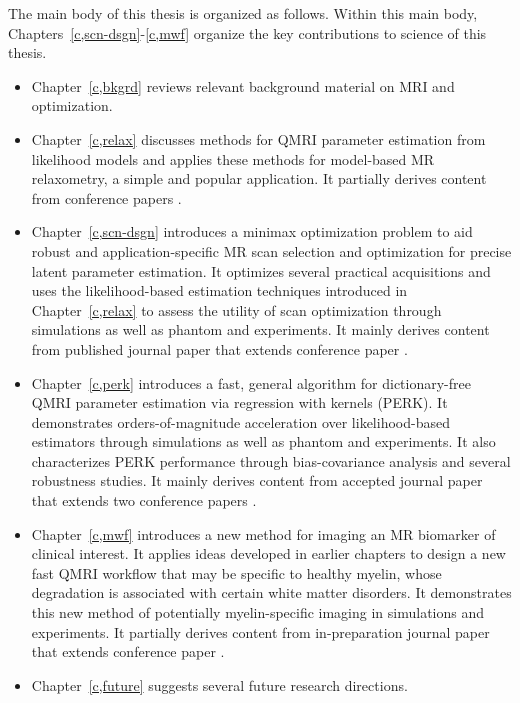 The main body of this thesis is organized as follows.
Within this main body,
Chapters~\ref{c,scn-dsgn}-\ref{c,mwf}
organize the key contributions to science
of this thesis.
\begin{itemize}
\setlength\itemsep{0.5em}
	\item{%
		Chapter~\ref{c,bkgrd} reviews 
		relevant background material
		on MRI and optimization.
	}%
	\item{%
		Chapter~\ref{c,relax} discusses methods 
		for QMRI parameter estimation 
		from likelihood models 
		and applies these methods 
		for model-based MR relaxometry,
		a simple and popular application.
		It partially derives content
		from conference papers 
		\cite{nataraj:14:rje,nataraj:14:mbe}.
	}%
	\item{%
		Chapter~\ref{c,scn-dsgn} introduces
		a minimax optimization problem
		to aid robust and application-specific 
		MR scan selection and optimization 
		for precise latent parameter estimation.
		It optimizes several practical acquisitions 
		and uses the likelihood-based estimation techniques 
		introduced in Chapter~\ref{c,relax}
		to assess the utility
		of scan optimization
		through simulations 
		as well as phantom and \invivo experiments.
		It mainly derives content
		from published journal paper
		\cite{nataraj:17:oms}
		that extends conference paper
		\cite{nataraj:15:amm}.
	}%
	\item{%
		Chapter~\ref{c,perk} introduces
		a fast, general algorithm
		for dictionary-free QMRI parameter estimation
		via regression with kernels (PERK).
		It demonstrates orders-of-magnitude acceleration 
		over likelihood-based estimators
		through simulations
		as well as phantom and \invivo experiments.
		It also characterizes PERK performance
		through bias-covariance analysis 
		and several robustness studies.
		It mainly derives content 
		from accepted journal paper
		\cite{nataraj::dfm} 
		that extends two conference papers
		\cite{nataraj:17:dfm,nataraj:17:slw}.
	}%
	\item{%
		Chapter~\ref{c,mwf} introduces a new method 
		for imaging an MR biomarker of clinical interest. 
		It applies ideas 
		developed in earlier chapters
		to design a new fast QMRI workflow
		that may be specific to healthy myelin,
		whose degradation is associated
		with certain white matter disorders.
		It demonstrates this new method 
		of potentially myelin-specific imaging
		in simulations and \invivo experiments.
		It partially derives content 
		from in-preparation journal paper \cite{nataraj::fmw}
		that extends conference paper \cite{nataraj:17:mwf}.
	}%
	\item{%
		Chapter~\ref{c,future} suggests 
		several future research directions.
	}%
\end{itemize}

